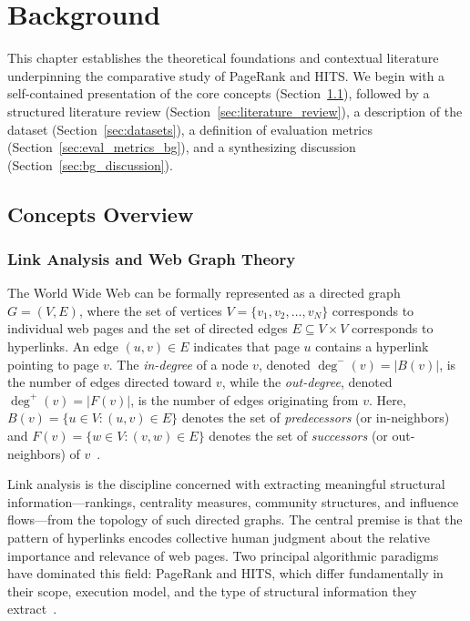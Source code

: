 \chapter{Background}
\label{ch:background}

This chapter establishes the theoretical foundations and contextual literature underpinning the comparative study of PageRank and HITS. We begin with a self-contained presentation of the core concepts (Section~\ref{sec:concepts_overview}), followed by a structured literature review (Section~\ref{sec:literature_review}), a description of the dataset (Section~\ref{sec:datasets}), a definition of evaluation metrics (Section~\ref{sec:eval_metrics_bg}), and a synthesizing discussion (Section~\ref{sec:bg_discussion}).


\section{Concepts Overview}
\label{sec:concepts_overview}

\subsection{Link Analysis and Web Graph Theory}
\label{subsec:link_analysis}

The World Wide Web can be formally represented as a directed graph $G = (V, E)$, where the set of vertices $V = \{v_1, v_2, \dots, v_N\}$ corresponds to individual web pages and the set of directed edges $E \subseteq V \times V$ corresponds to hyperlinks. An edge $(u, v) \in E$ indicates that page $u$ contains a hyperlink pointing to page $v$. The \textit{in-degree} of a node $v$, denoted $\deg^{-}(v) = |B(v)|$, is the number of edges directed toward $v$, while the \textit{out-degree}, denoted $\deg^{+}(v) = |F(v)|$, is the number of edges originating from $v$. Here, $B(v) = \{u \in V : (u,v) \in E\}$ denotes the set of \textit{predecessors} (or in-neighbors) and $F(v) = \{w \in V : (v,w) \in E\}$ denotes the set of \textit{successors} (or out-neighbors) of $v$~\cite{brin1998pagerank, stanford1999pagerank}.

Link analysis is the discipline concerned with extracting meaningful structural information---rankings, centrality measures, community structures, and influence flows---from the topology of such directed graphs. The central premise is that the pattern of hyperlinks encodes collective human judgment about the relative importance and relevance of web pages. Two principal algorithmic paradigms have dominated this field: PageRank and HITS, which differ fundamentally in their scope, execution model, and the type of structural information they extract~\cite{kleinberg1999hits, ijarcce_comparative}.


